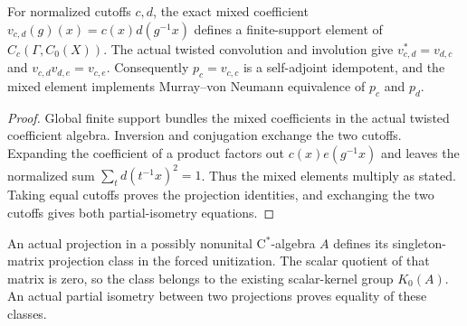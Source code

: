 \begin{proposition}\label{prop:algebraic-cutoff-projection}
\leanok
For normalized cutoffs $c,d$, the exact mixed coefficient
$v_{c,d}(g)(x)=c(x)d(g^{-1}x)$ defines a finite-support element of
$C_c(\Gamma,C_0(X))$. The actual twisted convolution and involution
give $v_{c,d}^*=v_{d,c}$ and $v_{c,d}v_{d,e}=v_{c,e}$.
Consequently $p_c=v_{c,c}$ is a self-adjoint idempotent, and the mixed
element implements Murray--von Neumann equivalence of $p_c$ and $p_d$.
\end{proposition}
\begin{proof}
\leanok
Global finite support bundles the mixed coefficients in the actual
twisted coefficient algebra. Inversion and conjugation exchange the two
cutoffs. Expanding the coefficient of a product factors out
$c(x)e(g^{-1}x)$ and leaves the normalized sum
$\sum_t d(t^{-1}x)^2=1$. Thus the mixed elements multiply as stated.
Taking equal cutoffs proves the projection identities, and exchanging
the two cutoffs gives both partial-isometry equations.
\end{proof}

\begin{definition}\label{def:nonunital-projection-k0}
\leanok
An actual projection in a possibly nonunital C$^*$-algebra $A$ defines
its singleton-matrix projection class in the forced unitization.
The scalar quotient of that matrix is zero, so the class belongs to
the existing scalar-kernel group $K_0(A)$. An actual partial isometry
between two projections proves equality of these classes.
\end{definition}

